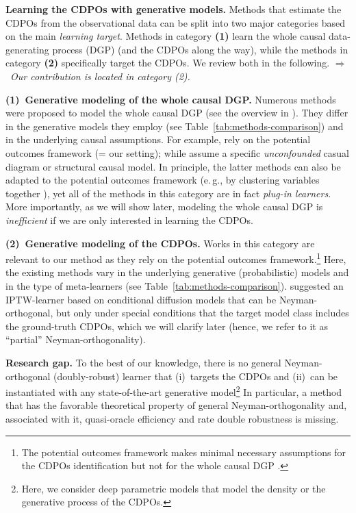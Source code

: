 \documentclass[dvipsnames]{article} %
\newcommand\eg{e.\,g.\xspace}
\newcommand{\CDPOs}{CDPOs\xspace}
\begin{document}
\textbf{Learning the \CDPOs with generative models.} Methods that estimate the \CDPOs from the observational data can be split into two major categories based on the main \emph{learning target}. Methods in category \textbf{(1)} learn the whole causal data-generating process (DGP) (and the \CDPOs along the way), while the methods in category \textbf{(2)} specifically target the \CDPOs. We review both in the following. $\Rightarrow$~\textit{Our contribution is located in category (2).}

\textbf{(1)~Generative modeling of the whole causal DGP.} Numerous methods were proposed to model the whole causal DGP (see the overview in \citet{komanduri2024from}). They differ in the generative models they employ (see Table~\ref{tab:methods-comparison}) and in the underlying causal assumptions. For example, \citet{louizos2017causal,zhang2021treatment} rely on the potential outcomes framework (= our setting); while \citet{kocaoglu2018causalgan,pawlowski2020deep,sauer2021counterfactual,sanchez2022diffusion,chao2023interventional,ribeiro2023high} assume a specific \emph{unconfounded} casual diagram or structural causal model. In principle, the latter methods can also be adapted to the potential outcomes framework (\eg, by clustering variables together \citep{anand2023causal}), yet all of the methods in this category are in fact \emph{plug-in learners}. More importantly, as we will show later, modeling the whole causal DGP is \emph{inefficient} if we are only interested in learning the \CDPOs.

\textbf{(2)~Generative modeling of the \CDPOs.} Works in this category are relevant to our method as they rely on the potential outcomes framework.\footnote{The potential outcomes framework makes minimal necessary assumptions for the \CDPOs identification but not for the whole causal DGP \citep{bareinboim2025structural}.} Here, the existing methods \citep{yoon2018ganite,vanderschueren2023noflite,ma2024diffpo,wu2025po} vary in the underlying generative (probabilistic) models and in the type of meta-learners (see Table~\ref{tab:methods-comparison}). \citet{ma2024diffpo} suggested an IPTW-learner based on conditional diffusion models that can be Neyman-orthogonal, but only under special conditions that the target model class includes the ground-truth \CDPOs, which we will clarify later (hence, we refer to it as ``partial'' Neyman-orthogonality).      



\textbf{Research gap.} To the best of our knowledge, there is no general Neyman-orthogonal (doubly-robust) learner that (i)~targets the \CDPOs and (ii)~can be instantiated with any state-of-the-art generative model\footnote{Here, we consider deep parametric models that model the density or the generative process of the \CDPOs.} In particular, a method that has the favorable theoretical property of general Neyman-orthogonality and, associated with it,  quasi-oracle efficiency and rate double robustness is missing.
\end{document}
